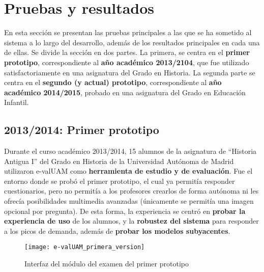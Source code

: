\chapter{Pruebas y resultados\label{sec:pruebasYResultados}}

En esta sección se presentan las pruebas principales a las que se ha sometido al sistema a lo largo del desarrollo, además de los resultados principales en cada una de ellas. Se divide la sección en dos partes. La primera, se centra en el \textbf{primer prototipo}, correspondiente al \textbf{año académico 2013/2104}, que fue utilizado satisfactoriamente en una asignatura del Grado en Historia. La segunda parte se centra en el \textbf{segundo (y actual) prototipo}, correspondiente al \textbf{año académico 2014/2015}, probado en una asignatura del Grado en Educación Infantil.


\section{2013/2014: Primer prototipo}


Durante el curso académico 2013/2014, 15 alumnos de la asignatura de ``Historia Antigua I'' del Grado en Historia de la Universidad Autónoma de Madrid utilizaron \acrshort{e-valUAM} como \textbf{herramienta de estudio y de evaluación}. Fue el entorno donde se probó el primer prototipo, el cual ya permitía responder cuestionarios, pero no permitía a los profesores crearlos de forma autónoma ni les ofrecía posibilidades multimedia avanzadas (únicamente se permitía una imagen opcional por pregunta). De esta forma, la experiencia se centró en \textbf{probar la experiencia de uso} de los alumnos, y la \textbf{robustez del sistema} para responder a los picos de demanda, además de \textbf{probar los modelos subyacentes}.

\begin{figure}[htp!]
	\centering
	\texttt{[image: e-valUAM\_primera\_version]}
	\caption{Interfaz del módulo del examen del primer prototipo}
	\label{fig:e-valUAM primera version}
\end{figure}

